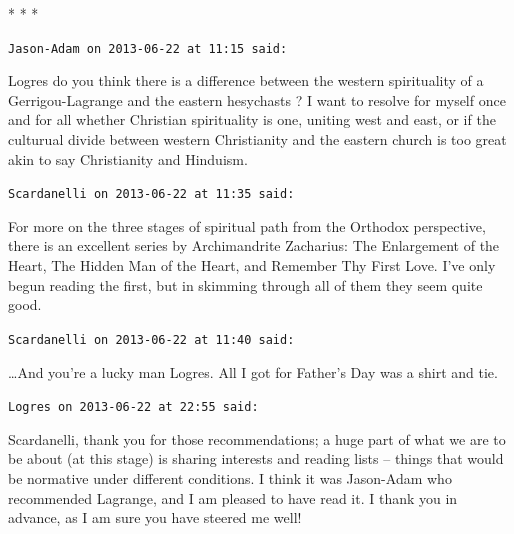 
\begin{center}* * *\end{center}

\begin{footnotesize}\begin{sffamily}



\texttt{Jason-Adam on 2013-06-22 at 11:15 said: }

Logres do you think there is a difference between the western spirituality of a Gerrigou-Lagrange and the eastern hesychasts ? I want to resolve for myself once and for all whether Christian spirituality is one, uniting west and east, or if the culturual divide between western Christianity and the eastern church is too great akin to say Christianity and Hinduism.


\hfill

\texttt{Scardanelli on 2013-06-22 at 11:35 said: }

For more on the three stages of spiritual path from the Orthodox perspective, there is an excellent series by Archimandrite Zacharius: The Enlargement of the Heart, The Hidden Man of the Heart, and Remember Thy First Love. I've only begun reading the first, but in skimming through all of them they seem quite good.


\hfill

\texttt{Scardanelli on 2013-06-22 at 11:40 said: }

…And you're a lucky man Logres. All I got for Father's Day was a shirt and tie.


\hfill

\texttt{Logres on 2013-06-22 at 22:55 said: }

Scardanelli, thank you for those recommendations; a huge part of what we are to be about (at this stage) is sharing interests and reading lists – things that would be normative under different conditions. I think it was Jason-Adam who recommended Lagrange, and I am pleased to have read it. I thank you in advance, as I am sure you have steered me well!


\end{sffamily}
\end{footnotesize}
